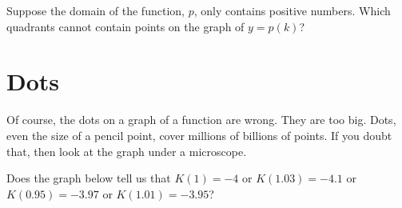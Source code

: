 \documentclass{ximera}
\begin{document}
\begin{question}
Suppose the domain of the function, $p$, only contains positive numbers.  Which quadrants cannot contain points on the graph of $y=p(k)$?

\begin{selectAll}
\end{selectAll}

\end{question}






























\section*{Dots}



Of course, the dots on a graph of a function are wrong. They are too big. Dots, even the size of a pencil point, cover millions of billions of points. If you doubt that, then look at the graph under a microscope.

Does the graph below tell us that $K(1) = -4$ or $K(1.03) = -4.1$ or $K(0.95) = -3.97$ or $K(1.01) = -3.95$?

\begin{image}
\end{image}
\end{document}
